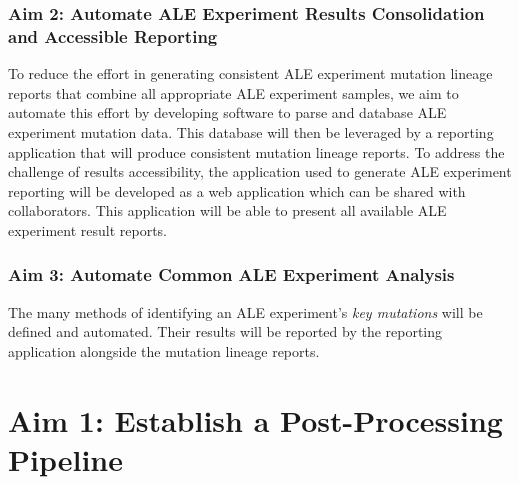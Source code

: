 \documentclass[12pt,final,masters,chapterheads]{ucsd}  %
\begin{document}
\subsection{Aim 2: Automate ALE Experiment Results Consolidation and Accessible Reporting}
To reduce the effort in generating consistent ALE experiment mutation lineage reports that combine all appropriate ALE experiment samples, we aim to automate this effort by developing software to parse and database ALE experiment mutation data. This database will then be leveraged by a reporting application that will produce consistent mutation lineage reports. To address the challenge of results accessibility, the application used to generate ALE experiment reporting will be developed as a web application which can be shared with collaborators. This application will be able to present all available ALE experiment result reports.
\subsection{Aim 3: Automate Common ALE Experiment Analysis}
The many methods of identifying an ALE experiment's \textit{key mutations} will be defined and automated. Their results will be reported by the reporting application alongside the mutation lineage reports.




\chapter{Aim 1: Establish a Post-Processing Pipeline}
\end{document}
